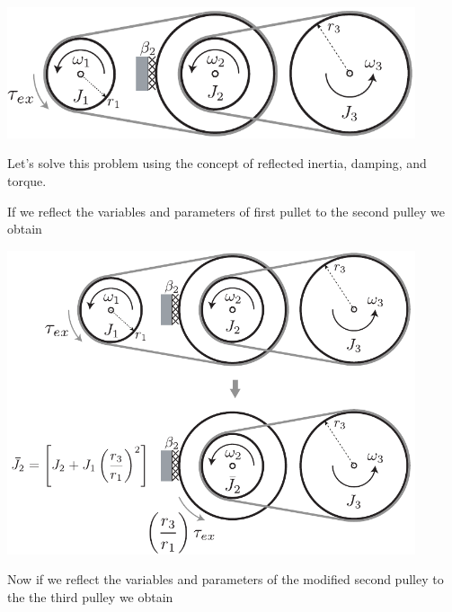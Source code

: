 \documentclass[twoside]{article}
\theoremstyle{definition}
\begin{document}
	\begin{minipage}[h]{1\linewidth}
    \begin{center}
      \includegraphics[width=0.9\textwidth]{beltpulleysystem}
    \end{center}
\end{minipage}

\vspace{12pt}

Let's solve this problem using the concept of reflected inertia, damping, and torque.
	
\vspace{6pt} 
	
If we reflect the variables and parameters of first pullet to the second pulley we obtain
	
\vspace{12pt}
	
	\begin{minipage}[h]{1\linewidth}
    \begin{center}
      \includegraphics[width=0.9\textwidth]{beltpulleysystem_sol1}
    \end{center}
\end{minipage}
    
\vspace{12pt}

Now if we reflect the variables and parameters of the modified second pulley to the the third pulley we obtain
    
\end{document}
